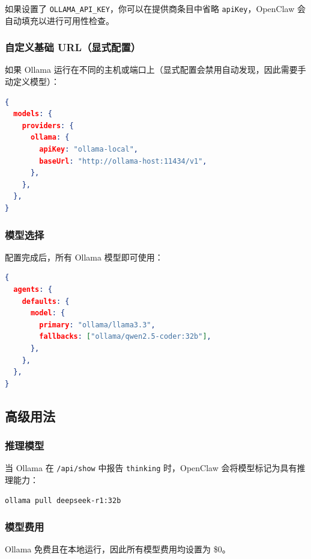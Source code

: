 如果设置了 \texttt{OLLAMA\_API\_KEY}，你可以在提供商条目中省略 \texttt{apiKey}，OpenClaw 会自动填充以进行可用性检查。

\subsubsection{自定义基础 URL（显式配置）}


如果 Ollama 运行在不同的主机或端口上（显式配置会禁用自动发现，因此需要手动定义模型）：

\begin{lstlisting}[language=json]
{
  models: {
    providers: {
      ollama: {
        apiKey: "ollama-local",
        baseUrl: "http://ollama-host:11434/v1",
      },
    },
  },
}
\end{lstlisting}


\subsubsection{模型选择}


配置完成后，所有 Ollama 模型即可使用：

\begin{lstlisting}[language=json]
{
  agents: {
    defaults: {
      model: {
        primary: "ollama/llama3.3",
        fallbacks: ["ollama/qwen2.5-coder:32b"],
      },
    },
  },
}
\end{lstlisting}


\subsection{高级用法}


\subsubsection{推理模型}


当 Ollama 在 \texttt{/api/show} 中报告 \texttt{thinking} 时，OpenClaw 会将模型标记为具有推理能力：

\begin{lstlisting}[language=bash]
ollama pull deepseek-r1:32b
\end{lstlisting}


\subsubsection{模型费用}


Ollama 免费且在本地运行，因此所有模型费用均设置为 \$0。

